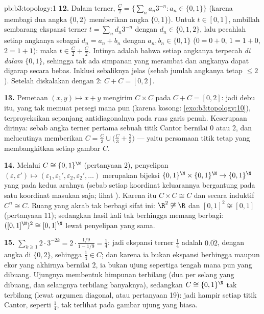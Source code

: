 \begin{solution}{pb:b3:topology:1}
\textbf{12.} Dalam terner, $\frac C2 = \{\sum_na_n3^{-n} : a_n
\in \{0, 1\}\}$ (karena membagi dua angka $\{0,2\}$ memberikan angka
$\{0,1\}$). Untuk $t \in [0,1]$, ambillah sembarang ekspansi terner $t =
\sum_nd_n3^{-n}$ dengan $d_n \in \{0,1,2\}$, lalu pecahlah setiap angkanya
sebagai $d_n = a_n + b_n$ dengan $a_n, b_n \in \{0,1\}$ ($0 = 0{+}0$,
$1 = 1{+}0$, $2 = 1{+}1$): maka $t \in \frac C2 + \frac C2$.
Intinya adalah bahwa setiap angkanya terpecah \emph{di dalam} $\{0,1\}$, sehingga
tak ada simpanan yang merambat dan angkanya dapat digarap
secara bebas. Inklusi sebaliknya jelas (sebab jumlah angkanya tetap
$\leq 2$). Setelah diskalakan dengan $2$: $C + C = [0,2]$.

\textbf{13.} Pemetaan $(x, y) \mapsto x + y$ mengirim $C \times C$
pada $C + C = [0,2]$: jadi debu itu, yang tak memuat persegi mana pun
(karena  kosong: \cref{exo:b3:topology:10}), terproyeksikan sepanjang
antidiagonalnya pada ruas garis penuh. Keserupaan dirinya: sebab
angka terner pertama sebuah titik Cantor bernilai $0$ atau $2$, dan
melucutinya memberikan $C = \frac C3 \cup \bigl(\frac C3 +
\frac23\bigr)$ --- yaitu persamaan titik tetap yang membangkitkan
setiap gambar $C$.

\textbf{14.} Melalui $C \cong \{0,1\}^\N$ (pertanyaan 2),
penyelipan $(\varepsilon, \varepsilon') \mapsto
(\varepsilon_1, \varepsilon_1', \varepsilon_2,
\varepsilon_2', \dots)$ merupakan bijeksi
$\{0,1\}^\N\times\{0,1\}^\N \to \{0,1\}^\N$ yang  pada kedua
arahnya (sebab setiap koordinat keluarannya bergantung pada satu koordinat
masukan saja; lihat ). Karena itu $C\times C \cong C$ dan
secara induktif $C^n \cong C$. Ruang yang akrab tak berbagi sifat ini:
$\R^2 \not\cong \R$ dan $[0,1]^2 \not\cong [0,1]$
(pertanyaan 11); sedangkan hasil kali tak berhingga memang berbagi: $([0,1]^\N)^2 \cong
[0,1]^\N$ lewat penyelipan yang sama.

\textbf{15.} $\sum_{k\geq1}2\cdot3^{-2k} = 2\cdot\frac{1/9}{1
- 1/9} = \frac14$: jadi ekspansi terner $\frac14$ adalah
$0.\overline{02}$, dengan angka di $\{0,2\}$, sehingga $\frac14 \in
C$; dan karena ia bukan ekspansi berhingga maupun ekor yang
akhirnya bernilai $2$, ia bukan ujung sepertiga tengah mana pun yang dibuang. Ujungnya
membentuk himpunan terbilang (dua per selang yang dibuang, dan selangnya
terbilang banyaknya), sedangkan $C \cong \{0,1\}^\N$ tak terbilang
(lewat argumen diagonal, atau pertanyaan 19): jadi hampir setiap titik
Cantor, seperti $\frac14$, tak terlihat pada gambar ujung yang
biasa.


\end{solution}
